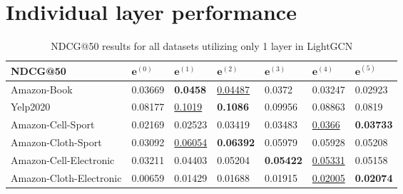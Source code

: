 \section{Individual layer performance} \label{subsec:individual-layer-combi}

\begin{table*}[]
    \centering
    \begin{tabular}{|l|l|l|l|l|l|l|}
        \hline
        NDCG@50                 & $\mathbf{e}^{(0)}$ & $\mathbf{e}^{(1)}$  & $\mathbf{e}^{(2)}$  & $\mathbf{e}^{(3)}$ & $\mathbf{e}^{(4)}$  & $\mathbf{e}^{(5)}$ \\ \hline
        Amazon-Book             & 0.03669            & \textbf{0.0458}     & \underline{0.04487} & 0.0372             & 0.03247             & 0.02923            \\ \hline
        Yelp2020                & 0.08177            & \underline{0.1019}  & \textbf{0.1086}     & 0.09956            & 0.08863             & 0.0819             \\ \hline
        Amazon-Cell-Sport       & 0.02169            & 0.02523             & 0.03419             & 0.03483            & \underline{0.0366}  & \textbf{0.03733}   \\ \hline
        Amazon-Cloth-Sport      & 0.03092            & \underline{0.06054} & \textbf{0.06392}    & 0.05979            & 0.05928             & 0.05208            \\ \hline
        Amazon-Cell-Electronic  & 0.03211            & 0.04403             & 0.05204             & \textbf{0.05422}   & \underline{0.05331} & 0.05158            \\ \hline
        Amazon-Cloth-Electronic & 0.00659            & 0.01429             & 0.01688             & 0.01915            & \underline{0.02005} & \textbf{0.02074}   \\ \hline
    \end{tabular}
    \caption{NDCG@50 results for all datasets utilizing only 1 layer in LightGCN}
    \label{tab:ndcg-individual}
\end{table*}

